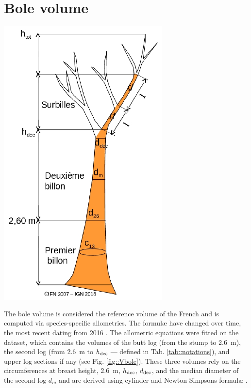 \chapter{Bole volume\label{chap::bole_v}}
\begin{marginfigure}
	\includegraphics[width = \marginparwidth]{Figures/tree2.pdf}
	\caption{\label{fig::Vbole}}
\end{marginfigure}
The bole volume is considered the reference volume of the French \NFI{} and is computed via species-specific allometries. The formul\ae{} have changed over time, the most recent dating from 2016 \parencite{Morneau2016}. The allometric equations were fitted on the \NFI{} dataset, which contains the volumes of the butt log (from the stump to \qty{2.6}{\metre}), the second log (from \qty{2.6}{\metre} to \( h_{\text{dec}} \) --- defined in Tab. \ref{tab::notations}), and upper log sections if any (see Fig. \ref{fig::Vbole}). These three volumes rely on the circumferences at breast height, \qty{2.6}{\metre}, \( h_{\text{dec}} \), \( d_{\text{dec}} \), and the median diameter of the second log \( d_m \) and are derived using cylinder and Newton-Simpsons formul\ae{} \parencite{Gohon2024}. \\

